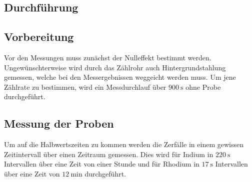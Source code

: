 \subsection{Durchführung}
\label{sec:durchführung}

\subsection{Vorbereitung}
Vor den Messungen muss zunächst der Nulleffekt bestimmt werden.
Ungewünschterweise wird durch das Zählrohr auch Hintergrundstahlung gemessen, welche bei den Messergebnissen weggeicht werden muss.
Um jene Zählrate zu bestimmen, wird ein Messdurchlauf über $\SI{900}{\second}$ ohne Probe durchgeführt.

\subsection{Messung der Proben}
Um auf die Halbwertszeiten zu kommen werden die Zerfälle in einem gewissen Zeitintervall über einen Zeitraum gemessen.
Dies wird für Indium in $\SI{220}{\second}$ Intervallen über eine Zeit von einer Stunde und für Rhodium in $\SI{17}{\second}$ Intervallen über eine Zeit von $\SI{12}{\minute}$ durchgeführt.
